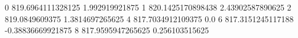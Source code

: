 0 819.6964111328125 1.992919921875
1 820.1425170898438 2.43902587890625
2 819.0849609375 1.3814697265625
4 817.7034912109375 0.0
6 817.3151245117188 -0.38836669921875
8 817.9595947265625 0.256103515625
